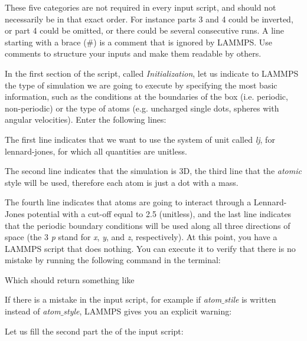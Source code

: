 \vspace{0.5cm} \noindent These five categories are not required in every
input script, and should not necessarily be in that
exact order. For instance parts 3 and 4 could be inverted, or
part 4 could be omitted, or there could be several
consecutive runs.
A line starting with a brace ($\#$) is a comment
that is ignored by LAMMPS. Use comments to structure 
your inputs and make them readable by others.

\vspace{0.5cm} \noindent In the first section of the script, called \textit{Initialization},
let us indicate to LAMMPS the type of simulation we are
going to execute by specifying the most basic information,
such as the conditions at the boundaries of the box (i.e.
periodic, non-periodic) or the type of atoms (e.g. uncharged
single dots, spheres with angular velocities). Enter the
following lines:

\vspace{0.5cm} \noindent The first line indicates that we want to
use the system of unit called \textit{lj}, for lennard-jones, for which all quantities
are unitless. 

\vspace{0.5cm} \noindent The second line indicates that the simulation
is 3D, the third line that the \textit{atomic} style
will be used, therefore each atom is just a dot with a mass.

\vspace{0.5cm} \noindent The fourth line indicates that atoms are going to interact
through a Lennard-Jones potential with a cut-off equal to
2.5 (unitless), and the last line indicates that the
periodic boundary conditions will be used along all three
directions of space (the 3 \textit{p} stand for \textit{x}, \textit{y}, and \textit{z},
respectively).
At this point, you have a LAMMPS script that does nothing.
You can execute it to verify that there is no mistake by
running the following command in the terminal:

\vspace{0.5cm} \noindent Which should return something like

\vspace{0.5cm} \noindent If there is a mistake in the input script, for example if
\textit{atom$\_$stile} is written instead of \textit{atom$\_$style}, LAMMPS
gives you an explicit warning:

\vspace{0.5cm} \noindent Let us fill the second part the of the input script:

